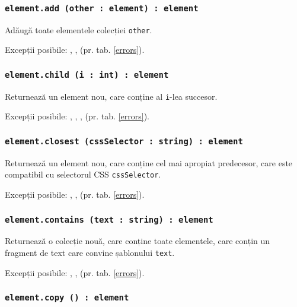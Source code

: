 \subsubsection{\texttt{element.add (other : element) : element}}

Adăugă toate elementele colecției \texttt{other}.

Excepții posibile: , ,  (pr. tab. \ref{errors}).

\subsubsection{\texttt{element.child (i : int) : element}}

Returnează un element nou, care conține al \texttt{i}-lea succesor.

Excepții posibile: , , ,  (pr. tab. \ref{errors}).

\subsubsection{\texttt{element.closest (cssSelector : string) : element}}

Returnează un element nou, care conține cel mai apropiat predecesor, care este compatibil cu selectorul CSS \texttt{cssSelector}.

Excepții posibile: , ,  (pr. tab. \ref{errors}).

\subsubsection{\texttt{element.contains (text : string) : element}}

Returnează o colecție nouă, care conține toate elementele, care conțin un fragment de text care convine șablonului \texttt{text}.

Excepții posibile: , ,  (pr. tab. \ref{errors}).

\subsubsection{\texttt{element.copy () : element}}


